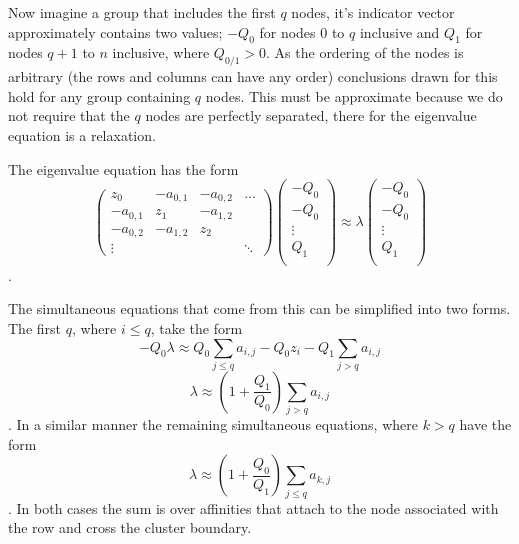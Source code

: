 Now imagine a group that includes the first \(q\) nodes,
it's indicator vector approximately contains two values; \(-Q_0\) for nodes \(0\) to \(q\) inclusive
and \(Q_1\) for nodes \(q+1\) to \(n\) inclusive,  where \(Q_{0/1} > 0\).
As the ordering of the nodes is arbitrary (the rows and columns can have any order)
conclusions drawn for this hold for any group containing \(q\) nodes.
This must be approximate because we do not require that the \(q\) nodes are perfectly separated,
there for the eigenvalue equation is a relaxation.

The eigenvalue equation has the form
\begin{equation}
    \begin{pmatrix}
        z_0 & -a_{0,1} & -a_{0,2} & \hdots \\
        -a_{0,1} & z_1 & -a_{1,2} & \\
        -a_{0,2} & -a_{1,2} & z_2 & \\
        \vdots   &          &     & \ddots 
    \end{pmatrix}
    \begin{pmatrix}
        -Q_0 \\
        -Q_0 \\
        \vdots \\
        Q_1 \\
    \end{pmatrix}
    \approx \lambda
    \begin{pmatrix}
        -Q_0 \\
        -Q_0 \\
        \vdots \\
        Q_1 \\
    \end{pmatrix}
\end{equation}.

The simultaneous equations that come from this can be simplified into two forms.
The first \(q\), where \(i \leq q\), take the form
\begin{equation}-Q_0 \lambda \approx Q_0 \sum_{j \leq q} a_{i,j} - Q_0 z_i - Q_1\sum_{j>q} a_{i,j}\end{equation}
\begin{equation}\lambda \approx \left(1 + \frac{Q_1}{Q_0}\right)\sum_{j>q} a_{i,j}\end{equation}.
In a similar manner the remaining simultaneous equations, where \(k > q\) have the form
\begin{equation}\lambda \approx \left(1 + \frac{Q_0}{Q_1}\right)\sum_{j\leq q} a_{k,j}\end{equation}.
In both cases the sum is over affinities that attach to the node associated with the row
and cross the cluster boundary.

